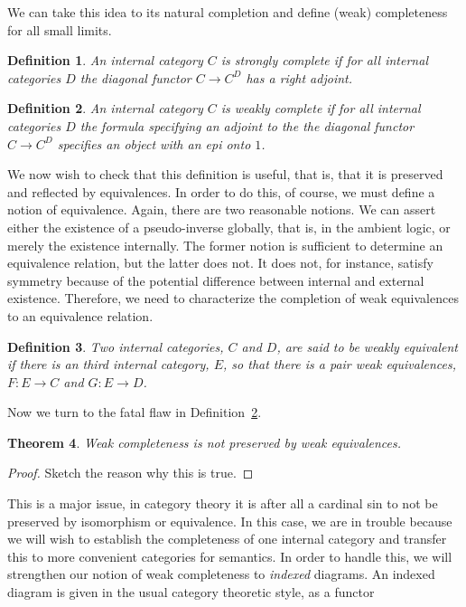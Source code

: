 \documentclass[12pt]{amsart}
\newtheorem{thm}{Theorem}[section]
\newtheorem{defn}[thm]{Definition}
\begin{document}
We can take this idea to its natural completion and define (weak)
completeness for all small limits.
\begin{defn}\label{defn:complete:complete}
  An internal category $C$ is strongly complete if for all internal
  categories $D$ the diagonal functor $C \to C^D$ has a right
  adjoint.
\end{defn}
\begin{defn}\label{defn:complete:weakcompletebroken}
  An internal category $C$ is weakly complete if for all internal
  categories $D$ the formula specifying an adjoint to the the diagonal
  functor $C \to C^D$ specifies an object with an epi onto $1$.
\end{defn}
We now wish to check that this definition is useful, that is, that it
is preserved and reflected by equivalences. In order to do this, of
course, we must define a notion of equivalence. Again, there are two
reasonable notions. We can assert either the existence of a
pseudo-inverse globally, that is, in the ambient logic, or merely the
existence internally. The former notion is sufficient to determine an
equivalence relation, but the latter does not. It does not, for
instance, satisfy symmetry because of the potential difference between
internal and external existence. Therefore, we need to characterize
the completion of weak equivalences to an equivalence relation.
\begin{defn}\label{defn:complete:weakequivalence}
  Two internal categories, $C$ and $D$, are said to be weakly
  equivalent if there is an third internal category, $E$, so that
  there is a pair weak equivalences, $F : E \to C$ and $G : E \to D$.
\end{defn}
Now we turn to the fatal flaw in
Definition~\ref{defn:complete:weakcompletebroken}.
\begin{thm}\label{thm:complete:weakcompletenotpreserved}
  Weak completeness is not preserved by weak equivalences.
\end{thm}
\begin{proof}
  Sketch the reason why this is true.
\end{proof}
This is a major issue, in category theory it is after all a cardinal
sin to not be preserved by isomorphism or equivalence. In this case,
we are in trouble because we will wish to establish the completeness
of one internal category and transfer this to more convenient
categories for semantics. In order to handle this, we will strengthen
our notion of weak completeness to \emph{indexed} diagrams. An indexed
diagram is given in the usual category theoretic style, as a functor
\end{document}
